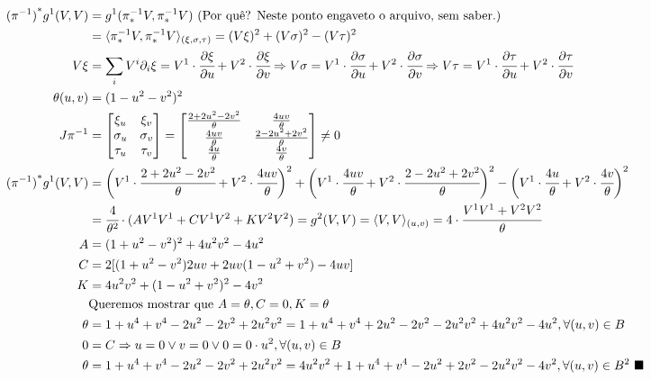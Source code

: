 \documentclass[10pt,a4paper]{article}
\begin{document}
		\begin{align*}
		{(\pi^{-1})}^* g^1(V,V) &= g^1(\pi^{-1}_* V, \pi^{-1}_* V) \text{ (Por qu\^e? Neste ponto engaveto o arquivo, sem saber.)} \\
		&= \langle \pi^{-1}_* V, \pi^{-1}_* V\rangle_{(\xi, \sigma, \tau)} = (V\xi)^2 + (V\sigma)^2 - (V\tau)^2 \\
		V\xi &= \sum_i V^i \partial_i \xi = V^1 \cdot \cfrac{\partial \xi}{\partial u} + V^2 \cdot \cfrac{\partial \xi}{\partial v} \Rightarrow V\sigma = V^1 \cdot \cfrac{\partial \sigma}{\partial u} + V^2 \cdot \cfrac{\partial \sigma}{\partial v} \Rightarrow V\tau = V^1 \cdot \cfrac{\partial \tau}{\partial u} + V^2 \cdot \cfrac{\partial \tau}{\partial v} \\
		\theta(u, v) &= (1 - u^2 - v^2)^2 \\
		J\pi^{-1} &= \left[ \begin{matrix} \xi_u & \xi_v \\ \sigma_u & \sigma_v \\ \tau_u & \tau_v \end{matrix} \right] = \left[ \begin{matrix} \frac{2 + 2u^2 - 2v^2}{\theta} & \frac{4uv}{\theta} \\ \frac{4uv}{\theta} & \frac{2 - 2u^2 + 2v^2}{\theta} \\ \frac{4u}{\theta} & \frac{4v}{\theta} \end{matrix} \right] \ne 0 \\
		{(\pi^{-1})}^* g^1(V,V) &= \bigg(V^1 \cdot \cfrac{2 + 2u^2 - 2v^2}{\theta} + V^2 \cdot \cfrac{4uv}{\theta}\bigg)^2 + \bigg(V^1 \cdot \cfrac{4uv}{\theta} + V^2 \cdot \cfrac{2 - 2u^2 + 2v^2}{\theta} \bigg)^2 - \bigg(V^1 \cdot \cfrac{4u}{\theta} + V^2 \cdot \cfrac{4v}{\theta} \bigg)^2 \\
	  &= \cfrac{4}{\theta^2} \cdot (A V^1 V^1 + C V^1 V^2 + K V^2 V^2) = g^2(V, V) = \langle V, V \rangle_{(u,v)} = 4 \cdot \cfrac{V^1 V^1 + V^2 V^2}{\theta} \\
		A &= (1 + u^2 - v^2)^2 + 4 u^2 v^2 - 4u^2 \\
		C &= 2 [(1 + u^2 - v^2)2uv + 2uv(1-u^2+v^2) - 4uv] \\
		K &= 4u^2v^2 + (1 - u^2 + v^2)^2 - 4v^2 \\
		&\text{Queremos mostrar que } A = \theta, C = 0, K = \theta \\
		\theta &= 1 + u^4 + v^4 - 2u^2 - 2v^2 + 2u^2 v^2 = 1 + u^4 + v^4 + 2u^2 - 2v^2 - 2u^2 v^2 + 4 u^2 v^2 - 4u^2, \forall (u,v) \in B \\
		0 &= C \Rightarrow u = 0 \vee v = 0 \vee 0 = 0\cdot u^2, \forall (u,v) \in B \\
		\theta &= 1 + u^4 + v^4 - 2u^2 - 2v^2 + 2u^2 v^2 = 4u^2 v^2 + 1 + u^4 + v^4 - 2u^2 + 2v^2 - 2u^2 v^2 - 4 v^2, \forall (u,v) \in B^2\,\,\blacksquare
		\end{align*}
\end{document}
